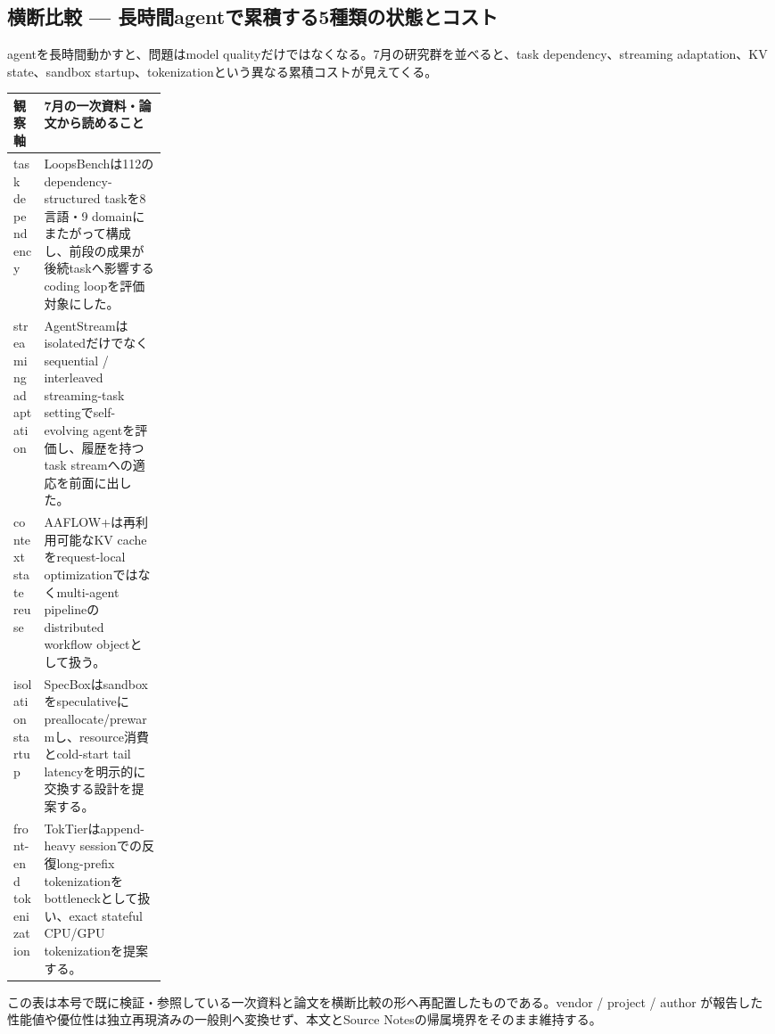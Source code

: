 \subsection*{横断比較 — 長時間agentで累積する5種類の状態とコスト}
agentを長時間動かすと、問題はmodel qualityだけではなくなる。7月の研究群を並べると、task dependency、streaming adaptation、KV state、sandbox startup、tokenizationという異なる累積コストが見えてくる。
\medskip
\begin{center}
\small
\renewcommand{\arraystretch}{1.16}
\begin{tabularx}{\linewidth}{@{}p{0.20\linewidth}X@{}}
\toprule
観察軸 & 7月の一次資料・論文から読めること \\
\midrule
task dependency & LoopsBenchは112のdependency-structured taskを8言語・9 domainにまたがって構成し、前段の成果が後続taskへ影響するcoding loopを評価対象にした。 \cite{src-30d9d574d4a1,src-4141dfcd9b12} \\
streaming adaptation & AgentStreamはisolatedだけでなくsequential / interleaved streaming-task settingでself-evolving agentを評価し、履歴を持つtask streamへの適応を前面に出した。 \cite{src-30d9d574d4a1,src-4141dfcd9b12} \\
context state reuse & AAFLOW+は再利用可能なKV cacheをrequest-local optimizationではなくmulti-agent pipelineのdistributed workflow objectとして扱う。 \cite{src-4051106eaef3,src-2266222d4bb7,src-6513817b493c} \\
isolation startup & SpecBoxはsandboxをspeculativeにpreallocate/prewarmし、resource消費とcold-start tail latencyを明示的に交換する設計を提案する。 \cite{src-4051106eaef3,src-2266222d4bb7,src-6513817b493c} \\
front-end tokenization & TokTierはappend-heavy sessionでの反復long-prefix tokenizationをbottleneckとして扱い、exact stateful CPU/GPU tokenizationを提案する。 \cite{src-4051106eaef3,src-2266222d4bb7,src-6513817b493c} \\
\bottomrule
\end{tabularx}
\renewcommand{\arraystretch}{1.0}
\end{center}
\normalsize
\begin{claimboundary}[この比較の境界]
この表は本号で既に検証・参照している一次資料と論文を横断比較の形へ再配置したものである。vendor / project / author が報告した性能値や優位性は独立再現済みの一般則へ変換せず、本文とSource Notesの帰属境界をそのまま維持する。
\end{claimboundary}
